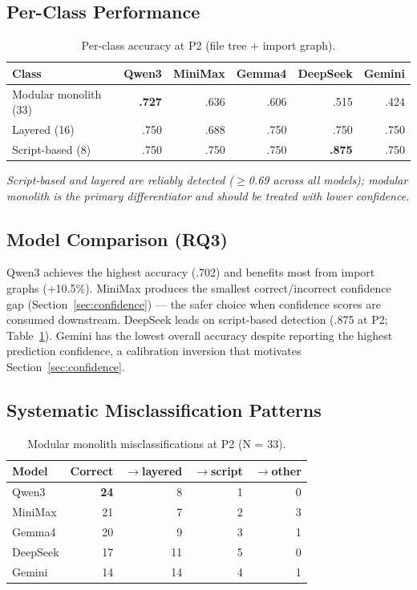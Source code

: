 \documentclass[runningheads]{llncs}
\begin{document}
\subsection{Per-Class Performance}

\begin{table}[htbp]
\caption{Per-class accuracy at P2 (file tree + import graph).}
\label{tab:per_class}
\centering
\small
\begin{tabular}{lrrrrr}
\toprule
\textbf{Class} & \textbf{Qwen3} & \textbf{MiniMax} & \textbf{Gemma4} & \textbf{DeepSeek} & \textbf{Gemini} \\
\midrule
Modular monolith (33) & \textbf{.727} & .636 & .606 & .515 & .424 \\
Layered (16)          & .750 & .688 & .750 & .750 & .750 \\
Script-based (8)      & .750 & .750 & .750 & \textbf{.875} & .750 \\
\bottomrule
\end{tabular}
\end{table}

\textit{Script-based and layered are reliably detected ($\geq$0.69 across all models); modular monolith is the primary differentiator and should be treated with lower confidence.}

\subsection{Model Comparison (RQ3)}

Qwen3 achieves the highest accuracy (.702) and benefits most from import graphs (+10.5\%). MiniMax produces the smallest correct/incorrect confidence gap (Section~\ref{sec:confidence}) --- the safer choice when confidence scores are consumed downstream. DeepSeek leads on script-based detection (.875 at P2; Table~\ref{tab:per_class}). Gemini has the lowest overall accuracy despite reporting the highest prediction confidence, a calibration inversion that motivates Section~\ref{sec:confidence}.

\subsection{Systematic Misclassification Patterns}

\begin{table}[htbp]
\caption{Modular monolith misclassifications at P2 (N = 33).}
\label{tab:mm_errors}
\centering
\small
\begin{tabular}{lrrrr}
\toprule
\textbf{Model} & \textbf{Correct} & $\rightarrow$\textbf{layered} & $\rightarrow$\textbf{script} & $\rightarrow$\textbf{other} \\
\midrule
Qwen3    & \textbf{24} & 8 & 1 & 0 \\
MiniMax  & 21 & 7 & 2 & 3 \\
Gemma4   & 20 & 9 & 3 & 1 \\
DeepSeek & 17 & 11 & 5 & 0 \\
Gemini   & 14 & 14 & 4 & 1 \\
\bottomrule
\end{tabular}
\end{table}
\end{document}
